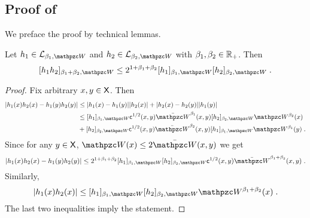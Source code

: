 \subsection{Proof of }
\label{sec:proof:rosenthal_V_poly_wasserstein}
We preface the proof by technical lemmas.
\begin{lemma}
\label{lem: product of two funct}
Let $h_1 \in \Lclass_{\beta_1, \lyapW}$ and $h_2 \in \Lclass_{\beta_2, \lyapW}$ with $\beta_1, \beta_2 \in \mathbb{R}_{+}$. Then 
\begin{equation*}
\Nnorm[\beta_1 + \beta_2, \lyapW]{h_1 h_2} \leq 2^{1+\beta_1 + \beta_2} \Nnorm[\beta_1, \lyapW]{h_1}  \Nnorm[\beta_2, \lyapW]{h_2}\eqsp.
\end{equation*}
\end{lemma}
\begin{proof}
Fix arbitrary $x, y \in \mathsf{X}$. Then
\begin{equation*}
\begin{split}
|h_1(x) h_2(x) - h_1(y) h_2(y)| &\leq |h_1(x) - h_1(y)||h_2(x)| + |h_2(x) - h_2(y)||h_1(y)| \\
& \leq \Nnorm[\beta_1, \lyapW]{h_1} \metricc^{1/2}(x,y) \bar \lyapW^{\beta_1}(x,y) \Nnorm[\beta_2, \lyapW]{h_2} \lyapW^{\beta_2}(x) \\
& + \Nnorm[\beta_2, \lyapW]{h_2} \metricc^{1/2}(x,y) \bar \lyapW^{\beta_2}(x,y) \Nnorm[\beta_1, \lyapW]{h_1} \lyapW^{\beta_1}(y)\eqsp.
\end{split}
\end{equation*}
Since for any $y \in \mathsf{X}$, $\lyapW(x) \leq 2\bar \lyapW(x,y)$ we get
\begin{equation*}
 |h_1(x) h_2(x) - h_1(y) h_2(y)| \le 2^{ 1 + \beta_1 + \beta_2} \Nnorm[\beta_1, \lyapW]{h_1}  \Nnorm[\beta_2, \lyapW]{h_2} \metricc^{1/2}(x,y) \bar \lyapW^{\beta_1+\beta_2}(x,y) \eqsp.
\end{equation*}
Similarly,
\begin{equation*}
|h_1(x) h_2(x)| \leq \Nnorm[\beta_1, \lyapW]{h_1}  \Nnorm[\beta_2, \lyapW]{h_2} \lyapW^{\beta_1 + \beta_2}(x)\eqsp.
\end{equation*}
The last two inequalities imply the statement.
\end{proof}

